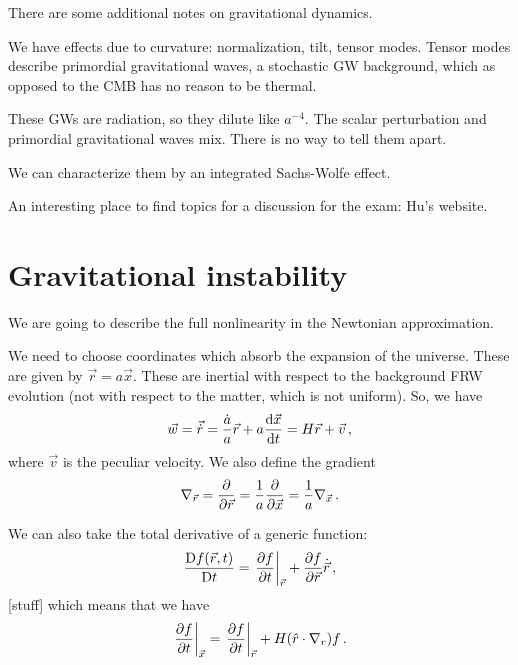 \documentclass[main.tex]{subfiles}
\begin{document}

There are some additional notes on gravitational dynamics.

We have effects due to curvature: normalization, tilt, tensor modes. 
Tensor modes describe primordial gravitational waves, a stochastic GW background, which as opposed to the CMB has no reason to be thermal. 

These GWs are radiation, so they dilute like \(a^{-4}\). 
The scalar perturbation and primordial gravitational waves mix. There is no way to tell them apart.

We can characterize them by an integrated Sachs-Wolfe effect. 

An interesting place to find topics for a discussion for the exam: Hu's website.

\section{Gravitational instability}

We are going to describe the full nonlinearity in the Newtonian approximation. 

We need to choose coordinates which absorb the expansion of the universe. These are given by \(\vec{r} = a \vec{x}\). 
These are inertial with respect to the background FRW evolution (not with respect to the matter, which is not uniform).
So, we have 
%
\begin{align}
\vec{w} = \vec{\dot{r}} = \frac{\dot{a}}{a} \vec{r}
+ a \dv{\vec{x}}{t} = H \vec{r} + \vec{v}
\,,
\end{align}
%
where \(\vec{v}\) is the peculiar velocity. We also define the gradient 
%
\begin{align}
\nabla_{\vec{r}} = \pdv{}{\vec{r}} = \frac{1}{a} \pdv{}{\vec{x}} = \frac{1}{a} \nabla_{\vec{x}} 
\,.
\end{align}

We can also take the total derivative of a generic function: 
%
\begin{align}
\frac{\DD f(\vec{r}, t)}{\DD t}
= \eval{\pdv{f}{t}}_{\vec{r}} + \pdv{f}{\vec{r}} \dot{\vec{r}} 
\,,
\end{align}
%
[stuff]
which means that we have 
%
\begin{align}
\eval{\pdv{f}{t}}_{\vec{x}} = \eval{\pdv{f}{t}}_{\vec{r}}
+ H \qty(\hat{r} \cdot \nabla_{r}) f
\,.
\end{align}
\end{document}
